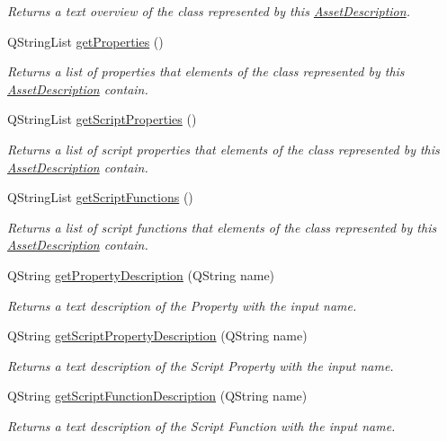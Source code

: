 \begin{DoxyCompactItemize}
\begin{DoxyCompactList}\small\item\em Returns a text overview of the class represented by this \hyperlink{struct_asset_description}{Asset\-Description}. \end{DoxyCompactList}\item 
Q\-String\-List \hyperlink{struct_asset_description_a175937f0fbc7e76844ec8976bc026488}{get\-Properties} ()
\begin{DoxyCompactList}\small\item\em Returns a list of properties that elements of the class represented by this \hyperlink{struct_asset_description}{Asset\-Description} contain. \end{DoxyCompactList}\item 
Q\-String\-List \hyperlink{struct_asset_description_a946b6d3957d5de50c98f625752824478}{get\-Script\-Properties} ()
\begin{DoxyCompactList}\small\item\em Returns a list of script properties that elements of the class represented by this \hyperlink{struct_asset_description}{Asset\-Description} contain. \end{DoxyCompactList}\item 
Q\-String\-List \hyperlink{struct_asset_description_a51e7879b7845273d65fad8a84acf8ca4}{get\-Script\-Functions} ()
\begin{DoxyCompactList}\small\item\em Returns a list of script functions that elements of the class represented by this \hyperlink{struct_asset_description}{Asset\-Description} contain. \end{DoxyCompactList}\item 
Q\-String \hyperlink{struct_asset_description_a05d49643654521fed3383db23063b227}{get\-Property\-Description} (Q\-String name)
\begin{DoxyCompactList}\small\item\em Returns a text description of the Property with the input name. \end{DoxyCompactList}\item 
Q\-String \hyperlink{struct_asset_description_a4d1a984473f0a0b0b89df7db5511a8ab}{get\-Script\-Property\-Description} (Q\-String name)
\begin{DoxyCompactList}\small\item\em Returns a text description of the Script Property with the input name. \end{DoxyCompactList}\item 
Q\-String \hyperlink{struct_asset_description_a706be959befda5857e291ce6f66fad0e}{get\-Script\-Function\-Description} (Q\-String name)
\begin{DoxyCompactList}\small\item\em Returns a text description of the Script Function with the input name. \end{DoxyCompactList}\end{DoxyCompactItemize}
